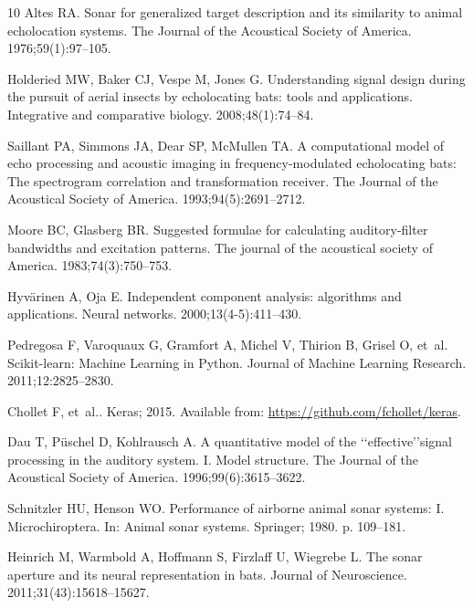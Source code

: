 \documentclass[10pt,letterpaper]{article}
\begin{document}
\begin{thebibliography}{10}
	Altes RA.
	\newblock Sonar for generalized target description and its similarity to animal
	echolocation systems.
	\newblock The Journal of the Acoustical Society of America. 1976;59(1):97--105.
	
	Holderied MW, Baker CJ, Vespe M, Jones G.
	\newblock Understanding signal design during the pursuit of aerial insects by
	echolocating bats: tools and applications.
	\newblock Integrative and comparative biology. 2008;48(1):74--84.
	
	Saillant PA, Simmons JA, Dear SP, McMullen TA.
	\newblock A computational model of echo processing and acoustic imaging in
	frequency-modulated echolocating bats: The spectrogram correlation and
	transformation receiver.
	\newblock The Journal of the Acoustical Society of America.
	1993;94(5):2691--2712.
	
	Moore BC, Glasberg BR.
	\newblock Suggested formulae for calculating auditory-filter bandwidths and
	excitation patterns.
	\newblock The journal of the acoustical society of America.
	1983;74(3):750--753.
	
	Hyv{\"a}rinen A, Oja E.
	\newblock Independent component analysis: algorithms and applications.
	\newblock Neural networks. 2000;13(4-5):411--430.
	
	Pedregosa F, Varoquaux G, Gramfort A, Michel V, Thirion B, Grisel O, et~al.
	\newblock Scikit-learn: Machine Learning in {P}ython.
	\newblock Journal of Machine Learning Research. 2011;12:2825--2830.
	
	Chollet F, et~al.. Keras; 2015.
	\newblock Available from: \url{https://github.com/fchollet/keras}.
	
	Dau T, P{\"u}schel D, Kohlrausch A.
	\newblock A quantitative model of the ‘‘effective’’signal processing in
	the auditory system. I. Model structure.
	\newblock The Journal of the Acoustical Society of America.
	1996;99(6):3615--3622.
	
	Schnitzler HU, Henson WO.
	\newblock Performance of airborne animal sonar systems: I. Microchiroptera.
	\newblock In: Animal sonar systems. Springer; 1980. p. 109--181.
	
	Heinrich M, Warmbold A, Hoffmann S, Firzlaff U, Wiegrebe L.
	\newblock The sonar aperture and its neural representation in bats.
	\newblock Journal of Neuroscience. 2011;31(43):15618--15627.
	

\end{thebibliography}
\end{document}
